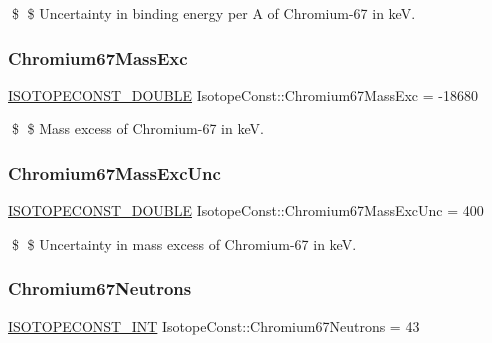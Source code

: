 \$ \$ Uncertainty in binding energy per A of Chromium-\/67 in keV. \mbox{\label{group___isotope_const-_chromium-_cr67_ga73cec639acdfa84a212304a5454660eb}} 
\subsubsection{\texorpdfstring{Chromium67\+Mass\+Exc}{Chromium67MassExc}}
{\footnotesize\ttfamily \mbox{\hyperlink{group___isotope_const-_macros_ga8f45a7272ce02c0b4c65c44636ed719a}{I\+S\+O\+T\+O\+P\+E\+C\+O\+N\+S\+T\+\_\+\+D\+O\+U\+B\+LE}} Isotope\+Const\+::\+Chromium67\+Mass\+Exc = -\/18680}

\$ \$ Mass excess of Chromium-\/67 in keV. \mbox{\label{group___isotope_const-_chromium-_cr67_gab0522a658542932918a12926ce1d7159}} 
\subsubsection{\texorpdfstring{Chromium67\+Mass\+Exc\+Unc}{Chromium67MassExcUnc}}
{\footnotesize\ttfamily \mbox{\hyperlink{group___isotope_const-_macros_ga8f45a7272ce02c0b4c65c44636ed719a}{I\+S\+O\+T\+O\+P\+E\+C\+O\+N\+S\+T\+\_\+\+D\+O\+U\+B\+LE}} Isotope\+Const\+::\+Chromium67\+Mass\+Exc\+Unc = 400}

\$ \$ Uncertainty in mass excess of Chromium-\/67 in keV. \mbox{\label{group___isotope_const-_chromium-_cr67_ga02136780166fad425c632e2a07fd7ca0}} 
\subsubsection{\texorpdfstring{Chromium67\+Neutrons}{Chromium67Neutrons}}
{\footnotesize\ttfamily \mbox{\hyperlink{group___isotope_const-_macros_ga5f18360b3e99483a35c32d789e62621c}{I\+S\+O\+T\+O\+P\+E\+C\+O\+N\+S\+T\+\_\+\+I\+NT}} Isotope\+Const\+::\+Chromium67\+Neutrons = 43}


